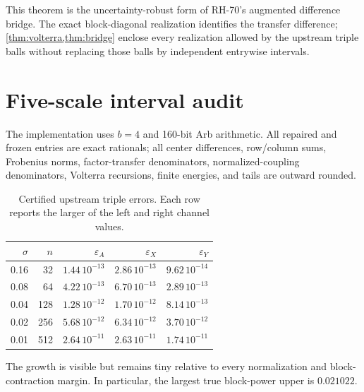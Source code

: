 \documentclass[11pt]{article}
\theoremstyle{definition}
\begin{document}
This theorem is the uncertainty-robust form of RH-70's augmented difference
bridge.  The exact block-diagonal realization identifies the transfer
difference; \cref{thm:volterra,thm:bridge} enclose every realization allowed by
the upstream triple balls without replacing those balls by independent
entrywise intervals.

\section{Five-scale interval audit}
\label{sec:audit}

The implementation uses $b=4$ and 160-bit Arb arithmetic.  All repaired and
frozen entries are exact rationals; all center differences, row/column sums,
Frobenius norms, factor-transfer denominators, normalized-coupling
denominators, Volterra recursions, finite energies, and tails are outward
rounded.

\begin{table}[H]
\centering
\small
\caption{Certified upstream triple errors.  Each row reports the larger of
the left and right channel values.}
\label{tab:triple}
\begin{tabular}{@{}rrrrr@{}}
\toprule
$\sigma$ & $n$ & $\varepsilon_A$ & $\varepsilon_X$ & $\varepsilon_Y$\\
\midrule
0.16 & 32  & $1.44\,10^{-13}$ & $2.86\,10^{-13}$ & $9.62\,10^{-14}$\\
0.08 & 64  & $4.22\,10^{-13}$ & $6.70\,10^{-13}$ & $2.89\,10^{-13}$\\
0.04 & 128 & $1.28\,10^{-12}$ & $1.70\,10^{-12}$ & $8.14\,10^{-13}$\\
0.02 & 256 & $5.68\,10^{-12}$ & $6.34\,10^{-12}$ & $3.70\,10^{-12}$\\
0.01 & 512 & $2.64\,10^{-11}$ & $2.63\,10^{-11}$ & $1.74\,10^{-11}$\\
\bottomrule
\end{tabular}
\end{table}

The growth is visible but remains tiny relative to every normalization and
block-contraction margin.  In particular, the largest true block-power upper
is $0.021022$.
\end{document}
